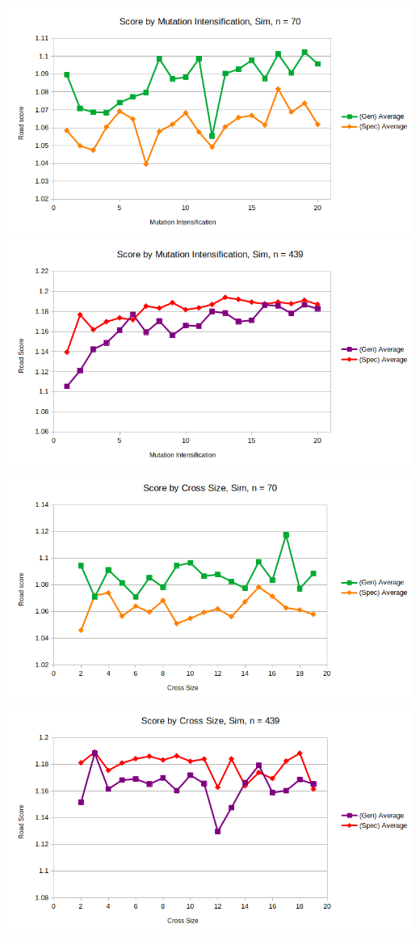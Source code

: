 \documentclass{article}
\begin{document}
\includegraphics[scale=0.36]{mISim70}
\includegraphics[scale=0.36]{mISim439}
\includegraphics[scale=0.36]{cSSim70}
\includegraphics[scale=0.36]{cSSim439}
\end{document}
